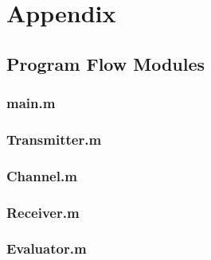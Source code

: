 \chapter*{Appendix}

\section*{Program Flow Modules}
\subsection*{main.m}
\begin{spacing}{1}
	\small
	
\end{spacing}

\subsection*{Transmitter.m}
\begin{spacing}{1}
	\small
	
\end{spacing}

\subsection*{Channel.m}
\begin{spacing}{1}
	\small
	
\end{spacing}

\subsection*{Receiver.m}
\begin{spacing}{1}
	\small
	
\end{spacing}

\subsection*{Evaluator.m}
\begin{spacing}{1}
	\small
	
\end{spacing}
